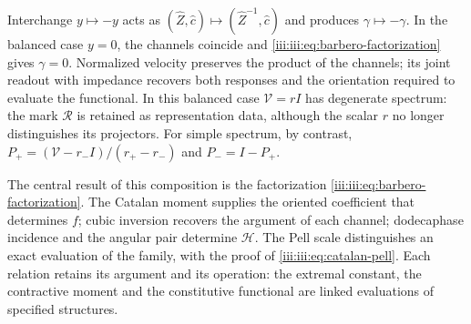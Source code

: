 Interchange $y\mapsto-y$ acts as
$(\widehat Z,\widehat c)\mapsto(\widehat Z^{-1},\widehat c)$ and
produces $\gamma\mapsto-\gamma$. In the balanced case $y=0$,
the channels coincide and \eqref{iii:iii:eq:barbero-factorization} gives
$\gamma=0$. Normalized velocity preserves the product of the
channels; its joint readout with impedance recovers both
responses and the orientation required to evaluate the functional.
In this balanced case $\mathcal V=rI$ has degenerate spectrum:
the mark $\mathcal R$ is retained as representation data, although
the scalar $r$ no longer distinguishes its projectors. For simple spectrum,
by contrast,
$P_+=(\mathcal V-r_-I)/(r_+-r_-)$ and $P_-=I-P_+$.

The central result of this composition is the factorization
\eqref{iii:iii:eq:barbero-factorization}. The Catalan moment supplies the
oriented coefficient that determines $f$; cubic inversion recovers
the argument of each channel; dodecaphase incidence and the angular pair
determine $\mathcal H$. The Pell scale distinguishes an exact
evaluation of the family, with the proof of
\eqref{iii:iii:eq:catalan-pell}. Each relation retains its argument and its
operation: the extremal constant, the contractive moment and the constitutive
functional are linked evaluations of specified
structures.

